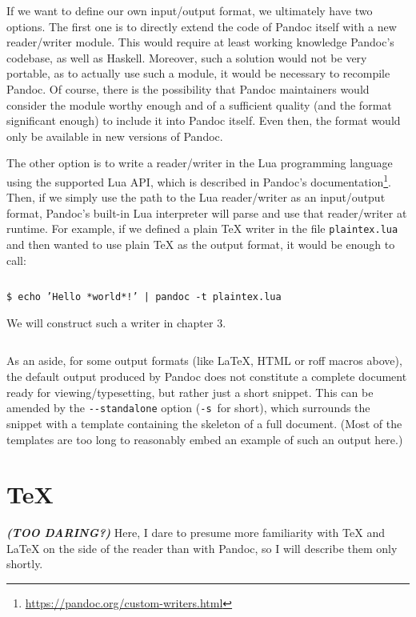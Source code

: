 \documentclass[
  digital,     %
  oneside,     %
  nosansbold,  %
  nocolorbold, %
  lof,         %
  lot,         %
]{fithesis4}
\begin{document}
$ $

If we want to define our own input/output format, we ultimately have two options. The first one is to directly extend the code of Pandoc itself with a new reader/writer module. This would require at least working knowledge Pandoc's codebase, as well as Haskell. Moreover, such a solution would not be very portable, as to actually use such a module, it would be necessary to recompile Pandoc. Of course, there is the possibility that Pandoc maintainers would consider the module worthy enough and of a sufficient quality (and the format significant enough) to include it into Pandoc itself. Even then, the format would only be available in new versions of Pandoc.

The other option is to write a reader/writer in the Lua programming language using the supported Lua API, which is described in Pandoc's documentation\footnote{\url{https://pandoc.org/custom-writers.html}}. Then, if we simply use the path to the Lua reader/writer as an input/output format, Pandoc's built-in Lua interpreter will parse and use that reader/writer at runtime. For example, if we defined a plain \TeX{} writer in the file \texttt{plaintex.lua} and then wanted to use plain \TeX{} as the output format, it would be enough to call:

$ $

\noindent
\texttt{\$ echo 'Hello *world*!' | pandoc -t plaintex.lua} \\

$ $

We will construct such a writer in chapter 3.

$ $

As an aside, for some output formats (like \LaTeX{}, HTML or roff macros above), the default output produced by Pandoc does not constitute a complete document ready for viewing/typesetting, but rather just a short snippet. This can be amended by the \texttt{-{}-standalone} option (\texttt{-s}~for short), which surrounds the snippet with a template containing the skeleton of a full document. (Most of the templates are too long to reasonably embed an example of such an output here.)

\section{\TeX{}}
\textit{\textbf{(TOO DARING?)}} Here, I dare to presume more familiarity with \TeX{} and \LaTeX{} on the side of the reader than with Pandoc, so I will describe them only shortly.
\end{document}
